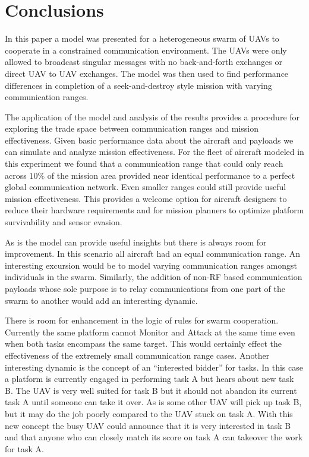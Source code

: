 \chapter{Conclusions}
In this paper a model was presented for a heterogeneous swarm of UAVs to cooperate in a constrained communication environment.  The UAVs were only allowed to broadcast singular messages with no back-and-forth exchanges or direct UAV to UAV exchanges.  The model was then used to find performance differences in completion of a seek-and-destroy style mission with varying communication ranges.

The application of the model and analysis of the results provides a procedure for exploring the trade space between communication ranges and mission effectiveness.  Given basic performance data about the aircraft and payloads we can simulate and analyze mission effectiveness.  For the fleet of aircraft modeled in this experiment we found that a communication range that could only reach across $10\%$ of the mission area provided near identical performance to a perfect global communication network.  Even smaller ranges could still provide useful mission effectiveness.  This provides a welcome option for aircraft designers to reduce their hardware requirements and for mission planners to optimize platform survivability and sensor evasion.

As is the model can provide useful insights but there is always room for improvement.  In this scenario all aircraft had an equal communication range.  An interesting excursion would be to model varying communication ranges amongst individuals in the swarm.  Similarly, the addition of non-RF based communication payloads whose sole purpose is to relay communications from one part of the swarm to another would add an interesting dynamic.

There is room for enhancement in the logic of rules for swarm cooperation.  Currently the same platform cannot Monitor and Attack at the same time even when both tasks encompass the same target.  This would certainly effect the effectiveness of the extremely small communication range cases.  Another interesting dynamic is the concept of an ``interested bidder'' for tasks.  In this case a platform is currently engaged in performing task A but hears about new task B.  The UAV is very well suited for task B but it should not abandon its current task A until someone can take it over.  As is some other UAV will pick up task B, but it may do the job poorly compared to the UAV stuck on task A.  With this new concept the busy UAV could announce that it is very interested in task B and that anyone who can closely match its score on task A can takeover the work for task A.



